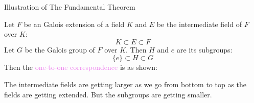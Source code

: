 \documentclass{beamer}
\begin{document}
\begin{frame}{Illustration of The Fundamental Theorem}
  \begin{minipage}{0.65\textwidth}
  Let \(F\) be an Galois extension of a field \(K\) and \(E\) be the intermediate field of \(F\) over \(K\):
  \[
    K \subset E \subset F
  \]
\noindent
  Let \(G\) be the Galois group of \(F\) over \(K\). Then \(H\) and \({e}\) are its subgroups:
  \[
    \{e\} \subset H \subset G
  \]
  Then the \textcolor{violet}{one-to-one correspondence} is as shown:
\end{minipage}
\begin{minipage}{0.3\textwidth}

  \begin{tcolorbox}[colback=white, colback=orange!20, colframe=orange!80!black, title={\footnotesize \textcolor{white}{Galois-correspondence}}, width=4cm]
  \end{tcolorbox}
\end{minipage}

\vspace{5mm}

 \begin{tcolorbox}[colback=white, colframe=blue!40, boxsep=0mm]
\begin{definition}[Remark]
  The intermediate fields are getting larger as we go from bottom to top  as the fields are getting extended. But the subgroups are getting smaller.
\end{definition}
\end{tcolorbox}
\end{frame}
\end{document}

